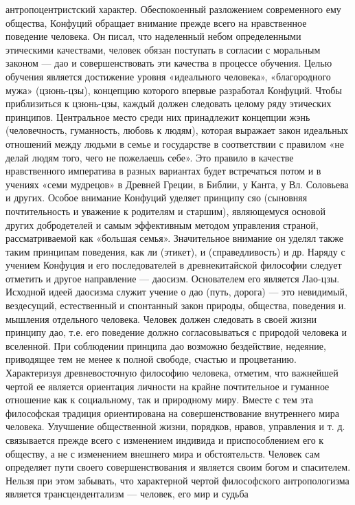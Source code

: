\documentclass[12pt]{article}
\begin{document}
антропоцентристский характер.
Обеспокоенный  разложением  современного  ему  общества,  Конфуций  обращает  внимание  прежде  всего  на
нравственное поведение человека. Он писал, что наделенный небом определенными этическими качествами,
человек обязан поступать в согласии с моральным законом — дао и совершенствовать эти качества в процессе
обучения. Целью обучения является достижение уровня «идеального человека», «благородного мужа» (цзюнь-цзы), концепцию которого впервые разработал Конфуций. Чтобы приблизиться к цзюнь-цзы, каждый должен
следовать целому ряду этических принципов. Центральное место среди них принадлежит концепции жэнь
(человечность, гуманность, любовь к людям), которая выражает закон идеальных отношений между людьми в
семье и государстве в соответствии с правилом «не делай людям того, чего не пожелаешь себе». Это правило в
качестве нравственного императива в разных вариантах будет встречаться потом и в учениях «семи мудрецов» в
Древней Греции, в Библии, у Канта, у Вл. Соловьева и других. Особое внимание Конфуций уделяет принципу
сяо (сыновняя почтительность и уважение к родителям и старшим), являющемуся основой других добродетелей
и самым эффективным методом управления страной, рассматриваемой как «большая семья». Значительное
внимание он уделял также таким принципам поведения, как ли (этикет), и (справедливость) и др.
Наряду с учением Конфуция и его последователей в древнекитайской философии следует отметить и другое
направление — даосизм. Основателем его является Лао-цзы. Исходной идеей даосизма служит учение о дао
(путь, дорога) — это невидимый, вездесущий, естественный и спонтанный закон природы, общества, поведения
и. мышления отдельного человека. Человек должен следовать в своей жизни принципу дао, т.е. его поведение
должно  согласовываться  с  природой  человека  и  вселенной.  При  соблюдении  принципа  дао  возможно
бездействие, недеяние, приводящее тем не менее к полной свободе, счастью и процветанию.
Характеризуя древневосточную философию человека, отметим, что важнейшей чертой ее является ориентация
личности на крайне почтительное и гуманное отношение как к социальному, так и природному миру. Вместе с
тем эта философская традиция ориентирована на совершенствование внутреннего мира человека. Улучшение
общественной жизни, порядков, нравов, управления и т. д. связывается прежде всего с изменением индивида и
приспособлением его к обществу, а не с изменением внешнего мира и обстоятельств. Человек сам определяет
пути  своего  совершенствования  и  является  своим  богом  и  спасителем.  Нельзя  при  этом  забывать,  что
характерной чертой философского антропологизма является трансцендентализм — человек, его мир и судьба
\end{document}
